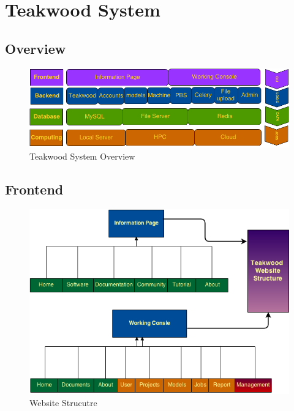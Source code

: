 \chapter{Teakwood System }

\section{Overview}
\begin{figure}[htb]
\centering
\includegraphics[scale=0.5]{./system_structure} 
\caption{Teakwood System Overview}
\label{fig:label} %
\end{figure}
\section{Frontend}
\begin{figure}[htb]
\centering
\includegraphics[scale=0.7]{./website_structure} %
\caption{Website Strucutre}
\label{fig:label} %
\end{figure}
